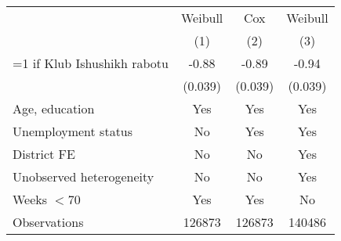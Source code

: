 \begin{tabular}{l*{3}{c}}
\toprule
                &\multicolumn{1}{c}{Weibull}&\multicolumn{1}{c}{Cox}&\multicolumn{1}{c}{Weibull}\\
                \cmidrule{2-4}
                \scriptsize{ & (1) & (2) & (3)} \\
\midrule

=1 if Klub Ishushikh rabotu&    -0.88&    -0.89&    -0.94\\
                &  (0.039)&  (0.039)&  (0.039)\\
                
\midrule                
Age, education & Yes & Yes & Yes \\
Unemployment status & No & Yes & Yes \\
District FE & No & No & Yes \\
Unobserved heterogeneity & No & No & Yes \\
Weeks $< 70$ & Yes & Yes & No \\

\midrule
Observations    &   126873&   126873&   140486\\
\bottomrule
\end{tabular}
